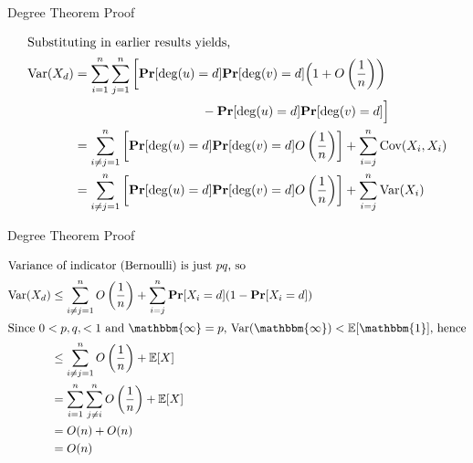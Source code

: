 \begin{frame}{Degree Theorem Proof}
    \setlength{\abovedisplayskip}{2pt}
        \setlength{\belowdisplayskip}{0pt}
        \setlength{\abovedisplayshortskip}{2pt}
        \setlength{\belowdisplayshortskip}{0pt}
    \begin{proofs}
        \begin{align*}
            \intertext{Substituting in earlier results yields,}
            \text{Var}(X_d) &= \sum_{ i =1}^n \sum_{j = 1}^n \left[\textbf{Pr}[\deg(u) = d]\textbf{Pr}[\deg(v) = d]\Big(1 + O\left(\frac{1}{n}\right)\right) \\
            &\qquad \qquad \qquad \qquad \qquad- \textbf{Pr}[\deg(u) = d]\textbf{Pr}[\deg(v) = d]\Big]\\
            &= \sum_{i \neq j = 1}^n \left[\textbf{Pr}[\deg(u) = d]\textbf{Pr}[\deg(v) = d]O\left(\frac{1}{n}\right)\right] + \sum_{i = j}^n \text{Cov}(X_i, X_i)\\
            &= \sum_{i \neq j = 1}^n \left[\textbf{Pr}[\deg(u) = d]\textbf{Pr}[\deg(v) = d]O\left(\frac{1}{n}\right)\right] + \sum_{i = j}^n \text{Var}(X_i)
        \end{align*}
    \end{proofs}
\end{frame}

\begin{frame}{Degree Theorem Proof}
    \setlength{\abovedisplayskip}{2pt}
        \setlength{\belowdisplayskip}{0pt}
        \setlength{\abovedisplayshortskip}{2pt}
        \setlength{\belowdisplayshortskip}{0pt}
    \begin{proofs}
        \begin{align*}
            \intertext{Variance of indicator (Bernoulli) is just $pq$, so}
            \text{Var}(X_d)&\leq \sum_{i \neq j = 1}^n O\left(\frac{1}{n}\right) + \sum_{i = j}^n \textbf{Pr}[X_i = d](1 - \textbf{Pr}[X_i = d])\\
            \intertext{Since $0 < p, q, < 1$ and $\mathbb{\mathcal{\mathbbm{1}}} = p$, $\text{Var}(\mathcal{\mathbbm{1}}) < \mathbb{E}[\mathbbm{1}]$, hence}
            &\leq \sum_{i \neq j = 1}^n O\left(\frac{1}{n}\right) + \mathbb{E}[X]\\
            &= \sum_{i = 1}^n \sum_{j \neq i}^n O\left(\frac{1}{n}\right) + \mathbb{E}[X]\\
            &= O(n) + O(n)\\
            &= O(n)
        \end{align*}
    \end{proofs}
\end{frame}

